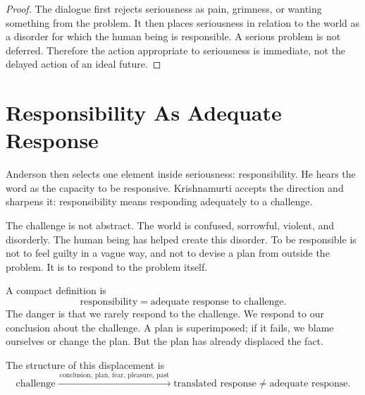 \begin{proof}
The dialogue first rejects seriousness as pain, grimness, or wanting something from the problem. It then places seriousness in relation to the world as a disorder for which the human being is responsible. A serious problem is not deferred. Therefore the action appropriate to seriousness is immediate, not the delayed action of an ideal future.
\end{proof}

\section{Responsibility As Adequate Response}

Anderson then selects one element inside seriousness: responsibility. He hears the word as the capacity to be responsive. Krishnamurti accepts the direction and sharpens it: responsibility means responding adequately to a challenge.

The challenge is not abstract. The world is confused, sorrowful, violent, and disorderly. The human being has helped create this disorder. To be responsible is not to feel guilty in a vague way, and not to devise a plan from outside the problem. It is to respond to the problem itself.

A compact definition is
\begin{equation}
\text{responsibility}
=
\text{adequate response to challenge}.
\end{equation}
The danger is that we rarely respond to the challenge. We respond to our conclusion about the challenge. A plan is superimposed; if it fails, we blame ourselves or change the plan. But the plan has already displaced the fact.

The structure of this displacement is
\begin{equation}
\text{challenge}
\xrightarrow{\ \text{conclusion, plan, fear, pleasure, past}\ }
\text{translated response}
\neq
\text{adequate response}.
\end{equation}

\begin{figure}
\centering
{}
\end{figure}


